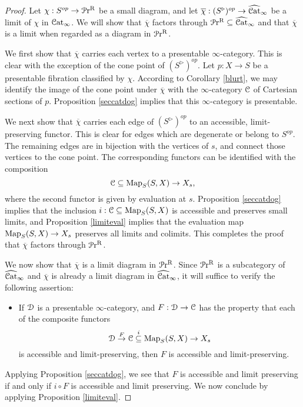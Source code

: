 \begin{proof}
Let $\chi: S^{op} \rightarrow \operatorname{\mathcal{P}r^{R}}$ be a small diagram, and let
$\overline{\chi}: (S^{\triangleright})^{op} \rightarrow \widehat{\operatorname{\mathcal{C}at}}_{\infty}$
be a limit of $\chi$ in $\operatorname{\mathcal{C}at}_{\infty}$. We will show that $\overline{\chi}$ factors
through $\operatorname{\mathcal{P}r^{R}} \subseteq \widehat{\operatorname{\mathcal{C}at}}_{\infty}$ and that $\overline{\chi}$ is a limit when regarded as a diagram in $\operatorname{\mathcal{P}r^{R}}$.

We first show that $\overline{\chi}$ carries each vertex to a presentable $\infty$-category.
This is clear with the exception of the cone point of $(S^{\triangleright})^{op}$. Let $p: X \rightarrow S$ be a presentable fibration classified by $\chi$. According to Corollary \ref{blurt}, we may identify the image of the cone point under $\overline{\chi}$ with the $\infty$-category $\operatorname{\mathcal{C}}$ of Cartesian sections of $p$. Proposition \ref{seccatdog} implies that this $\infty$-category is presentable.

We next show that $\overline{\chi}$ carries each edge of $(S^{\triangleright})^{op}$ to
an accessible, limit-preserving functor. This is clear for edges which are degenerate or belong
to $S^{op}$. The remaining edges are in bijection with the vertices of $s$, and connect those vertices to the cone point. The corresponding functors can be identified with the composition
$$ \operatorname{\mathcal{C}} \subseteq \operatorname{{Map}}_{S}(S,X) \rightarrow X_{s},$$
where the second functor is given by evaluation at $s$. Proposition \ref{seccatdog} implies
that the inclusion $i: \operatorname{\mathcal{C}} \subseteq \operatorname{{Map}}_{S}(S,X)$ is accessible and preserves small limits, and
Proposition \ref{limiteval} implies that the evaluation map $\operatorname{{Map}}_{S}(S,X) \rightarrow X_{s}$
preserves all limits and colimits. This completes the proof that $\overline{\chi}$ factors through $\operatorname{\mathcal{P}r^{R}}$.

We now show that $\overline{\chi}$ is a limit diagram in $\operatorname{\mathcal{P}r^{R}}$. Since $\operatorname{\mathcal{P}r^{R}}$ is a subcategory of $\widehat{\operatorname{\mathcal{C}at}}_{\infty}$ and $\overline{\chi}$ is already a limit diagram in $\widehat{\operatorname{\mathcal{C}at}}_{\infty}$, it will suffice to verify the following assertion:

\begin{itemize}
\item If $\operatorname{\mathcal{D}}$ is a presentable $\infty$-category, and $F: \operatorname{\mathcal{D}} \rightarrow \operatorname{\mathcal{C}}$ has the property that each of the composite functors
$$ \operatorname{\mathcal{D}} \stackrel{F}{\rightarrow} \operatorname{\mathcal{C}} \stackrel{i}{\subseteq} \operatorname{{Map}}_{S}(S,X) \rightarrow X_{s}$$
is accessible and limit-preserving, then $F$ is accessible and limit-preserving.
\end{itemize}

Applying Proposition \ref{seccatdog}, we see that $F$ is accessible and limit preserving if and only if $i \circ F$ is accessible and limit preserving. We now conclude by applying Proposition \ref{limiteval}.
\end{proof}

